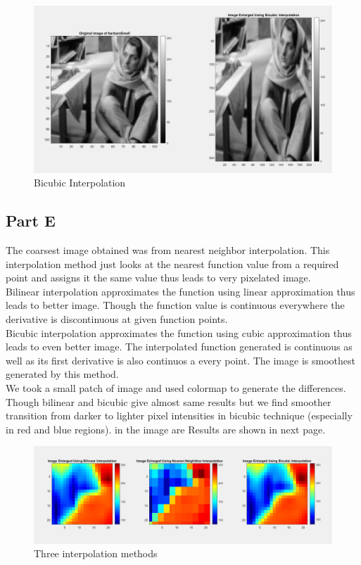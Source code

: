 \documentclass[12pt, a4paper]{article}
\begin{document}
\begin{figure}[h!]
  \centering
    \includegraphics[scale=0.4]{bicubic.png}
    \caption{Bicubic Interpolation}
  \label{fig:5}
\end{figure}

\subsection*{Part E}
The coarsest image obtained was from nearest neighbor interpolation. This interpolation method just looks at the nearest function value from a required point and assigns it the same value thus leads to very pixelated image.\\
Bilinear interpolation approximates the function using linear approximation thus leads to better image. Though the function value is continuous everywhere the derivative is discontinuous at given function points.\\
Bicubic interpolation approximates the function using cubic approximation thus leads to even better image. The interpolated function generated is continuous as well as its first derivative is also continuos a every point. The image is smoothest generated by this method. \\

We took a small patch of image and used colormap to generate the differences. Though bilinear and bicubic give almost same results but we find smoother transition from darker to lighter pixel intensities in bicubic technique (especially in red and blue regions). in the image are  Results are shown in next page. 
\begin{figure}[h!]
  \centering
    \includegraphics[scale=0.4]{comparision.png}
    \caption{Three interpolation methods}
  \label{fig:6}
\end{figure}
\end{document}
